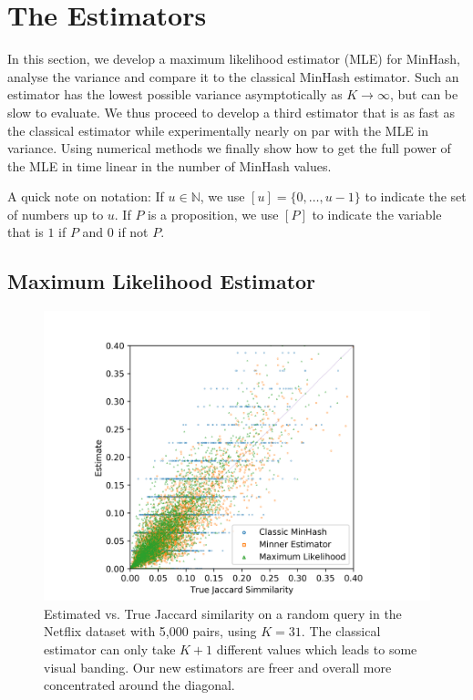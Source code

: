 
\section{The Estimators}

In this section, we develop a maximum likelihood estimator (MLE) for MinHash, analyse the variance and compare it to the classical MinHash estimator.
Such an estimator has the lowest possible variance asymptotically as $K\to\infty$, but can be slow to evaluate.
We thus proceed to develop a third estimator that is as fast as the classical estimator while experimentally nearly on par with the MLE in variance.
Using numerical methods we finally show how to get the full power of the MLE in time linear in the number of MinHash values.

A quick note on notation: If $u\in\mathbb N$, we use $[u]=\{0,\dots,u-1\}$ to indicate the set of numbers up to $u$.
If $P$ is a proposition, we use $[P]$ to indicate the variable that is $1$ if $P$ and $0$ if not $P$.

\subsection{Maximum Likelihood Estimator}\label{sec:mle}

\begin{figure}
   \centering
   \includegraphics[trim=30 5 30 35,clip,width=\linewidth]{figures/scatter}
   \caption{
      Estimated vs. True Jaccard similarity on a random query in the Netflix dataset with 5,000 pairs, using $K=31$.
      The classical estimator can only take $K+1$ different values which leads to some visual banding.
      Our new estimators are freer and overall more concentrated around the diagonal.
   }
   \label{fig:scatter}
\end{figure}

